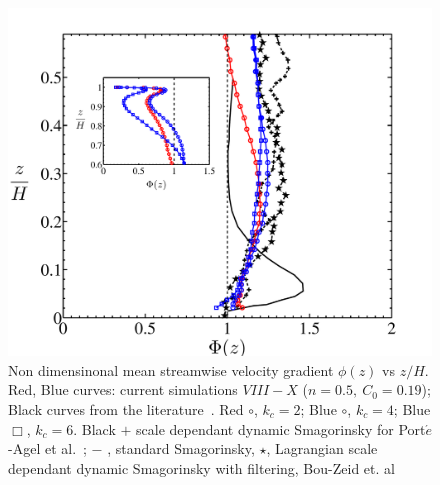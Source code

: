 \begin{figure}
\centering
\includegraphics[width = 0.75\linewidth]{Fig3/gradient_filt_n05.pdf}        
        \caption[$\Phi(z)$, Case $VIII-X$]{Non dimensinonal mean streamwise velocity gradient $\phi(z)$ vs $z/H$. Red, Blue curves: current simulations $VIII-X$ {($n = 0.5, \ C_0 = 0.19$)}; Black curves from the literature~\cite{porte1fun,bou1}. Red $\circ$, $k_{c}=2$; Blue $\circ$, $k_{c} = 4$; Blue $\Box$, $k_{c} = 6$. Black $+$ scale dependant dynamic Smagorinsky for Port$\acute{e}$-Agel et al.~\cite{porte1fun}; $-$ , standard Smagorinsky, $\star$, Lagrangian scale dependant dynamic Smagorinsky with filtering, Bou-Zeid et. al~\cite{bou1}}\label{fig:statb}
\end{figure}

